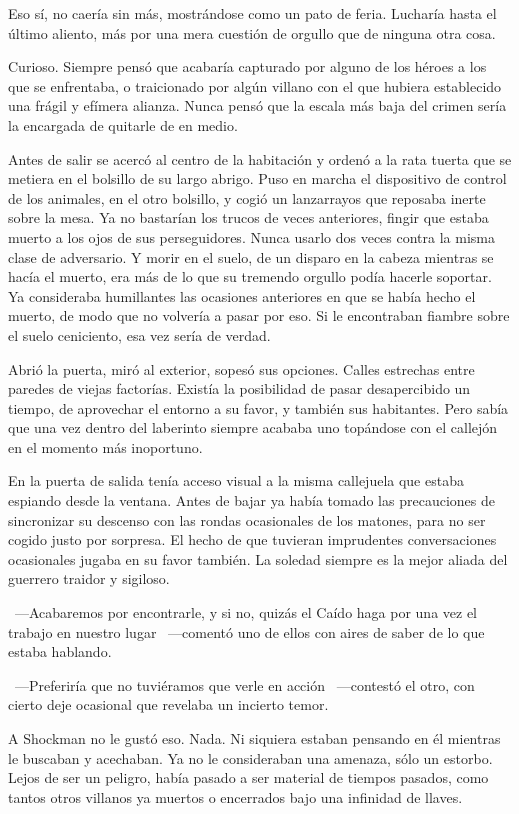 Eso sí, no caería sin más, mostrándose como un pato de feria. Lucharía hasta el último aliento, más por una mera cuestión de orgullo que de ninguna otra cosa.

Curioso. Siempre pensó que acabaría capturado por alguno de los héroes a los que se enfrentaba, o traicionado por algún villano con el que hubiera establecido una frágil y efímera alianza. Nunca pensó que la escala más baja del crimen sería la encargada de quitarle de en medio.

Antes de salir se acercó al centro de la habitación y ordenó a la rata tuerta que se metiera en el bolsillo de su largo abrigo. Puso en marcha el dispositivo de control de los animales, en el otro bolsillo, y cogió un lanzarrayos que reposaba inerte sobre la mesa. Ya no bastarían los trucos de veces anteriores, fingir que estaba muerto a los ojos de sus perseguidores. Nunca usarlo dos veces contra la misma clase de adversario. Y morir en el suelo, de un disparo en la cabeza mientras se hacía el muerto, era más de lo que su tremendo orgullo podía hacerle soportar. Ya consideraba humillantes las ocasiones anteriores en que se había hecho el muerto, de modo que no volvería a pasar por eso. Si le encontraban fiambre sobre el suelo ceniciento, esa vez sería de verdad.

Abrió la puerta, miró al exterior, sopesó sus opciones. Calles estrechas entre paredes de viejas factorías. Existía la posibilidad de pasar desapercibido un tiempo, de aprovechar el entorno a su favor, y también sus habitantes. Pero sabía que una vez dentro del laberinto siempre acababa uno topándose con el callejón en el momento más inoportuno.

En la puerta de salida tenía acceso visual a la misma callejuela que estaba espiando desde la ventana. Antes de bajar ya había tomado las precauciones de sincronizar su descenso con las rondas ocasionales de los matones, para no ser cogido justo por sorpresa. El hecho de que tuvieran imprudentes conversaciones ocasionales jugaba en su favor también. La soledad siempre es la mejor aliada del guerrero traidor y sigiloso.

~---Acabaremos por encontrarle, y si no, quizás el Caído haga por una vez el trabajo en nuestro lugar ~---comentó uno de ellos con aires de saber de lo que estaba hablando.

~---Preferiría que no tuviéramos que verle en acción ~---contestó el otro, con cierto deje ocasional que revelaba un incierto temor.

A Shockman no le gustó eso. Nada. Ni siquiera estaban pensando en él mientras le buscaban y acechaban. Ya no le consideraban una amenaza, sólo un estorbo. Lejos de ser un peligro, había pasado a ser material de tiempos pasados, como tantos otros villanos ya muertos o encerrados bajo una infinidad de llaves.

